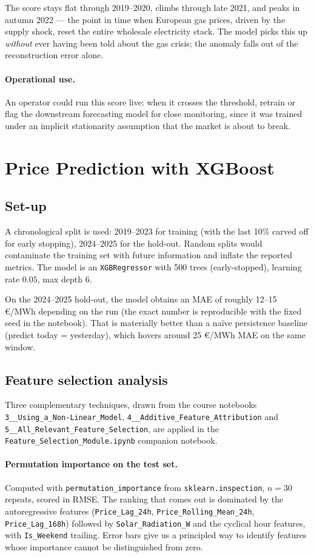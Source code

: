\documentclass[11pt,a4paper]{article}
\newcommand{\code}[1]{\allowbreak\texttt{\small #1}\allowbreak}
\begin{document}
The score stays flat through 2019--2020, climbs through late 2021, and
peaks in autumn 2022 --- the point in time when European gas prices,
driven by the supply shock, reset the entire wholesale electricity
stack. The model picks this up \emph{without} ever having been told
about the gas crisis; the anomaly falls out of the reconstruction error
alone.

\paragraph{Operational use.} An operator could run this score live: when
it crosses the threshold, retrain or flag the downstream forecasting
model for close monitoring, since it was trained under an implicit
stationarity assumption that the market is about to break.


\section{Price Prediction with XGBoost}

\subsection{Set-up}
A chronological split is used: 2019--2023 for training (with the last
10\% carved off for early stopping), 2024--2025 for the hold-out.
Random splits would contaminate the training set with future
information and inflate the reported metrics. The model is an
\code{XGBRegressor} with 500 trees (early-stopped), learning rate
$0.05$, max depth $6$.

On the 2024--2025 hold-out, the model obtains an MAE of roughly 12--15
\euro/MWh depending on the run (the exact number is reproducible with the
fixed seed in the notebook). That is materially better than a na\"ive
persistence baseline (predict today = yesterday), which hovers around
25 \euro/MWh MAE on the same window.

\subsection{Feature selection analysis}
Three complementary techniques, drawn from the course notebooks
\code{3\_\_Using\_a\_Non-Linear\_Model}, \code{4\_\_Additive\_Feature\_Attribution}
and \code{5\_\_All\_Relevant\_Feature\_Selection}, are applied in the
\code{Feature\_Selection\_Module.ipynb} companion notebook.

\paragraph{Permutation importance on the test set.}
Computed with \code{permutation\_importance} from
\code{sklearn.inspection}, $n=30$ repeats, scored in RMSE. The ranking
that comes out is dominated by the autoregressive features
(\code{Price\_Lag\_24h}, \code{Price\_Rolling\_Mean\_24h},
\code{Price\_Lag\_168h}) followed by \code{Solar\_Radiation\_W} and the
cyclical hour features, with \code{Is\_Weekend} trailing. Error bars
give us a principled way to identify features whose importance cannot
be distinguished from zero.
\end{document}
